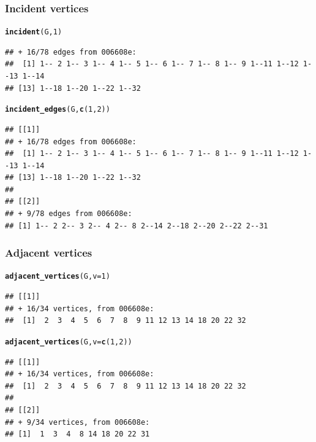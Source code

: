 \documentclass[aspectratio=169]{beamer}\usepackage[]{graphicx}\usepackage[]{xcolor}
\makeatletter
\newcommand{\hlnum}[1]{\textcolor[rgb]{0.686,0.059,0.569}{#1}}%
\newcommand{\hldef}[1]{\textcolor[rgb]{0.345,0.345,0.345}{#1}}%
\newcommand{\hlkwc}[1]{\textcolor[rgb]{0.333,0.667,0.333}{#1}}%
\newcommand{\hlkwd}[1]{\textcolor[rgb]{0.737,0.353,0.396}{\textbf{#1}}}%
\newenvironment{kframe}{%
 \def\at@end@of@kframe{}%
 \ifinner\ifhmode%
  \def\at@end@of@kframe{\end{minipage}}%
  \begin{minipage}{\columnwidth}%
 \fi\fi%
 \def\FrameCommand##1{\hskip\@totalleftmargin \hskip-\fboxsep
 \colorbox{shadecolor}{##1}\hskip-\fboxsep
     \hskip-\linewidth \hskip-\@totalleftmargin \hskip\columnwidth}%
 \MakeFramed {\advance\hsize-\width
   \@totalleftmargin\z@ \linewidth\hsize
   \@setminipage}}%
 {\par\unskip\endMakeFramed%
 \at@end@of@kframe}
\newenvironment{knitrout}{}{} %
\makeatother
\begin{document}
\begin{frame}[fragile]\frametitle{Incident vertices}
\begin{knitrout}
\color{fgcolor}\begin{kframe}
\begin{alltt}
\hlkwd{incident}\hldef{(G,} \hlnum{1}\hldef{)}
\end{alltt}
\begin{verbatim}
## + 16/78 edges from 006608e:
##  [1] 1-- 2 1-- 3 1-- 4 1-- 5 1-- 6 1-- 7 1-- 8 1-- 9 1--11 1--12 1--13 1--14
## [13] 1--18 1--20 1--22 1--32
\end{verbatim}
\begin{alltt}
\hlkwd{incident_edges}\hldef{(G,} \hlkwd{c}\hldef{(}\hlnum{1}\hldef{,} \hlnum{2}\hldef{))}
\end{alltt}
\begin{verbatim}
## [[1]]
## + 16/78 edges from 006608e:
##  [1] 1-- 2 1-- 3 1-- 4 1-- 5 1-- 6 1-- 7 1-- 8 1-- 9 1--11 1--12 1--13 1--14
## [13] 1--18 1--20 1--22 1--32
## 
## [[2]]
## + 9/78 edges from 006608e:
## [1] 1-- 2 2-- 3 2-- 4 2-- 8 2--14 2--18 2--20 2--22 2--31
\end{verbatim}
\end{kframe}
\end{knitrout}
\end{frame}

\begin{frame}[fragile]\frametitle{Adjacent vertices}
\begin{knitrout}
\color{fgcolor}\begin{kframe}
\begin{alltt}
\hlkwd{adjacent_vertices}\hldef{(G,} \hlkwc{v} \hldef{=} \hlnum{1}\hldef{)}
\end{alltt}
\begin{verbatim}
## [[1]]
## + 16/34 vertices, from 006608e:
##  [1]  2  3  4  5  6  7  8  9 11 12 13 14 18 20 22 32
\end{verbatim}
\begin{alltt}
\hlkwd{adjacent_vertices}\hldef{(G,} \hlkwc{v} \hldef{=} \hlkwd{c}\hldef{(}\hlnum{1}\hldef{,} \hlnum{2}\hldef{))}
\end{alltt}
\begin{verbatim}
## [[1]]
## + 16/34 vertices, from 006608e:
##  [1]  2  3  4  5  6  7  8  9 11 12 13 14 18 20 22 32
## 
## [[2]]
## + 9/34 vertices, from 006608e:
## [1]  1  3  4  8 14 18 20 22 31
\end{verbatim}
\end{kframe}
\end{knitrout}
\end{frame}
\end{document}
